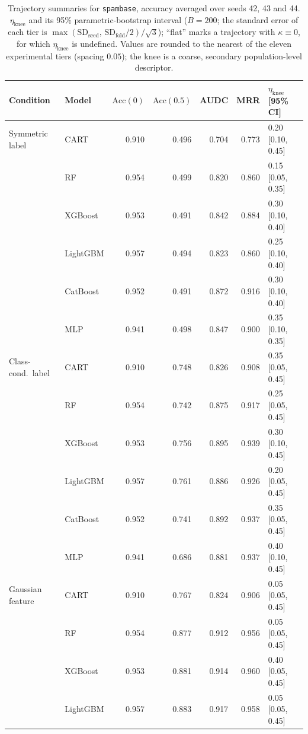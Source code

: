 \documentclass[pdflatex,sn-mathphys]{sn-jnl}
\theoremstyle{thmstyleone}
\begin{document}
\begin{table}[htbp]
\centering
\scriptsize
\setlength{\tabcolsep}{3.5pt}
\caption{Trajectory summaries for \texttt{spambase}, accuracy averaged over seeds 42, 43 and 44. $\eta_{\mathrm{knee}}$ and its 95\% parametric-bootstrap interval ($B=200$; the standard error of each tier is $\max(\mathrm{SD}_{\mathrm{seed}},\,\mathrm{SD}_{\mathrm{fold}}/2)/\sqrt3$); ``flat'' marks a trajectory with $\kappa\equiv 0$, for which $\eta_{\mathrm{knee}}$ is undefined. Values are rounded to the nearest of the eleven experimental tiers (spacing $0.05$); the knee is a coarse, secondary population-level descriptor.}
\label{tab:traj_spambase}
\begin{tabular}{@{}llrrrrl@{}}
\toprule
Condition & Model & $\mathrm{Acc}(0)$ & $\mathrm{Acc}(0.5)$ & AUDC & MRR & $\eta_{\mathrm{knee}}$ [95\% CI] \\
\midrule
Symmetric label & CART & 0.910 & 0.496 & 0.704 & 0.773 & 0.20 [0.10, 0.45] \\
 & RF & 0.954 & 0.499 & 0.820 & 0.860 & 0.15 [0.05, 0.35] \\
 & XGBoost & 0.953 & 0.491 & 0.842 & 0.884 & 0.30 [0.10, 0.40] \\
 & LightGBM & 0.957 & 0.494 & 0.823 & 0.860 & 0.25 [0.10, 0.40] \\
 & CatBoost & 0.952 & 0.491 & 0.872 & 0.916 & 0.30 [0.10, 0.40] \\
 & MLP & 0.941 & 0.498 & 0.847 & 0.900 & 0.35 [0.10, 0.35] \\
\midrule
Class-cond.\ label & CART & 0.910 & 0.748 & 0.826 & 0.908 & 0.35 [0.05, 0.45] \\
 & RF & 0.954 & 0.742 & 0.875 & 0.917 & 0.25 [0.05, 0.45] \\
 & XGBoost & 0.953 & 0.756 & 0.895 & 0.939 & 0.30 [0.10, 0.45] \\
 & LightGBM & 0.957 & 0.761 & 0.886 & 0.926 & 0.20 [0.05, 0.45] \\
 & CatBoost & 0.952 & 0.741 & 0.892 & 0.937 & 0.35 [0.05, 0.45] \\
 & MLP & 0.941 & 0.686 & 0.881 & 0.937 & 0.40 [0.10, 0.45] \\
\midrule
Gaussian feature & CART & 0.910 & 0.767 & 0.824 & 0.906 & 0.05 [0.05, 0.45] \\
 & RF & 0.954 & 0.877 & 0.912 & 0.956 & 0.05 [0.05, 0.45] \\
 & XGBoost & 0.953 & 0.881 & 0.914 & 0.960 & 0.40 [0.05, 0.45] \\
 & LightGBM & 0.957 & 0.883 & 0.917 & 0.958 & 0.05 [0.05, 0.45] \\

\end{tabular}
\end{table}
\end{document}
